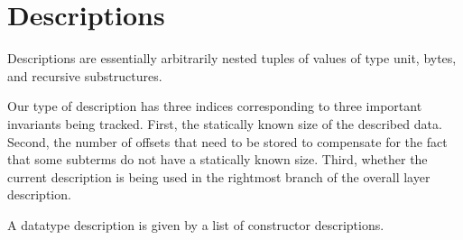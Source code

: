 \section{Descriptions}\label{sec:desc}

Descriptions are essentially arbitrarily nested tuples of
values of type unit,
bytes,
and recursive substructures.

Our type of description has three indices corresponding to three important
invariants being tracked.
%
First, the statically known size of the described data.
%
Second, the number of offsets that need to be stored to compensate for the
fact that some subterms do not have a statically known size.
%
Third, whether the current description is being used in the rightmost branch
of the overall layer description.




A datatype description is given by a list of constructor descriptions.




